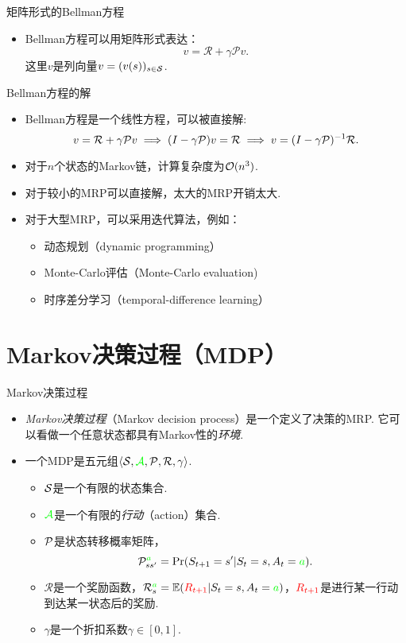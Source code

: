{矩阵形式的Bellman方程}
\begin{itemize}
    \item Bellman方程可以用矩阵形式表达：
        \[v = \mathcal R + \gamma \mathcal P v.\]
    这里$v$是列向量$v=(v(s))_{s\in\MS}$.
\end{itemize}


{Bellman方程的解}
\begin{itemize}
    \item Bellman方程是一个线性方程，可以被直接解:
    \[
        v =\mathcal R + \gamma \P v \implies (I-\gamma \P)v = \mathcal R \implies v = (I-\gamma \P)^{-1} \mathcal R.
   \]
    \item 对于$n$个状态的Markov链，计算复杂度为$\O(n^3)$.
    \item 对于较小的MRP可以直接解，太大的MRP开销太大.
    \item 对于大型MRP，可以采用迭代算法，例如：
    \begin{itemize}
        \item 动态规划（dynamic programming）
        \item Monte-Carlo评估（Monte-Carlo evaluation) 
        \item 时序差分学习（temporal-difference learning）
    \end{itemize}
\end{itemize}


\section{Markov决策过程（MDP）}
{Markov决策过程}
\begin{itemize}
    \item \emph{Markov决策过程}（Markov decision process）是一个定义了决策的MRP. 它可以看做一个任意状态都具有Markov性的\emph{环境}.
    \item 一个MDP是五元组$\langle\MS, \textcolor{green}{\mathcal A}, \P, \mathcal R, \gamma\rangle$.
        \begin{itemize}
            \item $\MS$是一个有限的状态集合.
            \item $\textcolor{green}{\mathcal A}$是一个有限的\emph{行动}（action）集合.
            \item $\P$是状态转移概率矩阵，
            \[\P_{ss'}^{\textcolor{green}{a}} = \Pr(S_{t+1} = s' | S_t = s, A_t = \textcolor{green}{a}).\]
            \item $\mathcal R$是一个奖励函数，$\mathcal R_s^{\textcolor{green}{a}} = \E(\textcolor{red}{R_{t+1}} | S_t = s, A_t = \textcolor{green}{a})$，$\textcolor{red}{R_{t+1}}$是进行某一行动到达某一状态后的奖励.
            \item $\gamma$是一个折扣系数$\gamma\in[0,1]$.
        \end{itemize}
    \end{itemize}


